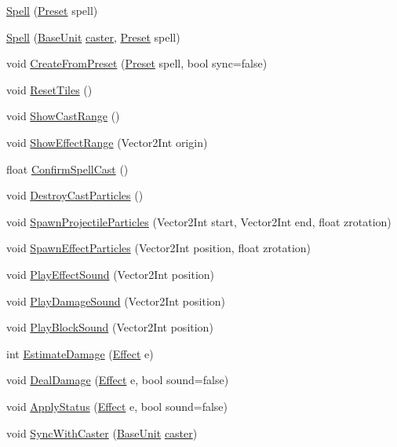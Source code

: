\begin{DoxyCompactItemize}
\item 
\mbox{\hyperlink{class_spell_a34acc5591bc0b3c8a1d9468e952be3c4}{Spell}} (\mbox{\hyperlink{class_spell_a5520e850e7000a6156b3456672b72ed1}{Preset}} spell)
\item 
\mbox{\hyperlink{class_spell_a555a02d92d6de53a3b6d39bfda11c2cc}{Spell}} (\mbox{\hyperlink{class_base_unit}{Base\+Unit}} \mbox{\hyperlink{class_spell_a682bd6dfb1e3dd20ef44711ca10c0f05}{caster}}, \mbox{\hyperlink{class_spell_a5520e850e7000a6156b3456672b72ed1}{Preset}} spell)
\item 
void \mbox{\hyperlink{class_spell_aee08370358e033af2bf7e0c4c2f2b2bd}{Create\+From\+Preset}} (\mbox{\hyperlink{class_spell_a5520e850e7000a6156b3456672b72ed1}{Preset}} spell, bool sync=false)
\item 
void \mbox{\hyperlink{class_spell_a267e0b312732b826127c2d58ba64d90d}{Reset\+Tiles}} ()
\item 
void \mbox{\hyperlink{class_spell_ad49f8d3af9c5a885120ca85b510eae75}{Show\+Cast\+Range}} ()
\item 
void \mbox{\hyperlink{class_spell_af7f2944573b064a7f561227d6f6fc601}{Show\+Effect\+Range}} (Vector2\+Int origin)
\item 
float \mbox{\hyperlink{class_spell_a89146285dc4dadf46398da2683bcc869}{Confirm\+Spell\+Cast}} ()
\item 
void \mbox{\hyperlink{class_spell_a46dfa81169863ddb791b3c7d5121fcb8}{Destroy\+Cast\+Particles}} ()
\item 
void \mbox{\hyperlink{class_spell_aaaea2d98c141ffd0838bac9ac5641349}{Spawn\+Projectile\+Particles}} (Vector2\+Int start, Vector2\+Int end, float zrotation)
\item 
void \mbox{\hyperlink{class_spell_ac96caa87a4e57a75bd70672a7cd9b83c}{Spawn\+Effect\+Particles}} (Vector2\+Int position, float zrotation)
\item 
void \mbox{\hyperlink{class_spell_a1dfbc90153df551bd995b8b852f808f0}{Play\+Effect\+Sound}} (Vector2\+Int position)
\item 
void \mbox{\hyperlink{class_spell_a80aa52e9ed4b3555bd04682d93bc5049}{Play\+Damage\+Sound}} (Vector2\+Int position)
\item 
void \mbox{\hyperlink{class_spell_a14ec832bc720a2763ff8a09f81d7c5d4}{Play\+Block\+Sound}} (Vector2\+Int position)
\item 
int \mbox{\hyperlink{class_spell_aa5a9b6a6b13fcd1cfed9eb43e123ca23}{Estimate\+Damage}} (\mbox{\hyperlink{class_effect}{Effect}} e)
\item 
void \mbox{\hyperlink{class_spell_ad2e4f64f1f7ced4b69c55619d5fdb0b0}{Deal\+Damage}} (\mbox{\hyperlink{class_effect}{Effect}} e, bool sound=false)
\item 
void \mbox{\hyperlink{class_spell_aa020942716a6504fc6b23351a4baa3b6}{Apply\+Status}} (\mbox{\hyperlink{class_effect}{Effect}} e, bool sound=false)
\item 
void \mbox{\hyperlink{class_spell_a65c49405edc86456dfdace46c81b1530}{Sync\+With\+Caster}} (\mbox{\hyperlink{class_base_unit}{Base\+Unit}} \mbox{\hyperlink{class_spell_a682bd6dfb1e3dd20ef44711ca10c0f05}{caster}})
\end{DoxyCompactItemize}
